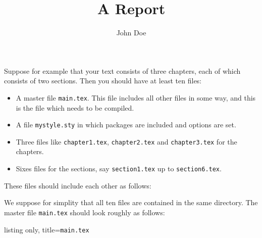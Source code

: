 Suppose for example that your text consists of three chapters, each of which consists of two sections.
Then you should have at least ten files:
\begin{itemize}
  \item
    A master file \texttt{main.tex}.
    This file includes all other files in some way, and this is the file which needs to be compiled.
  \item
    A file \texttt{mystyle.sty} in which packages are included and options are set.
  \item
    Three files like \texttt{chapter1.tex}, \texttt{chapter2.tex} and \texttt{chapter3.tex} for the chapters.
  \item
    Sixes files for the sections, say \texttt{section1.tex} up to \texttt{section6.tex}.
\end{itemize}
These files should include each other as follows:
\begin{center}
\end{center}
We suppose for simplity that all ten files are contained in the same directory.
The master file \texttt{main.tex} should look roughly as follows:
%
\begin{tcblisting}{listing only, title={\texttt{main.tex}}}

\usepackage{mystyle}

\title{A Report}
\author{John Doe}



\maketitle





\end{tcblisting}
